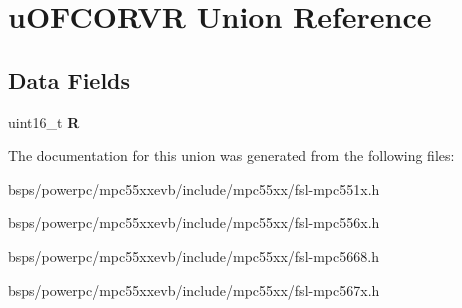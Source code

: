 \hypertarget{unionuOFCORVR}{}\section{u\+O\+F\+C\+O\+R\+VR Union Reference}
\label{unionuOFCORVR}
\subsection*{Data Fields}
\begin{DoxyCompactItemize}
\item 
\mbox{\label{unionuOFCORVR_ab3758563e746fde2c01b571961e1adaf}} 
uint16\+\_\+t {\bfseries R}
\end{DoxyCompactItemize}


The documentation for this union was generated from the following files\+:\begin{DoxyCompactItemize}
\item 
bsps/powerpc/mpc55xxevb/include/mpc55xx/fsl-\/mpc551x.\+h\item 
bsps/powerpc/mpc55xxevb/include/mpc55xx/fsl-\/mpc556x.\+h\item 
bsps/powerpc/mpc55xxevb/include/mpc55xx/fsl-\/mpc5668.\+h\item 
bsps/powerpc/mpc55xxevb/include/mpc55xx/fsl-\/mpc567x.\+h\end{DoxyCompactItemize}
